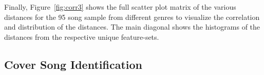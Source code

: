\noindent Finally, Figure~\ref{fig:corr3} shows the full scatter plot matrix of the various distances for the 95 song sample from different genres to visualize the correlation and distribution of the distances. The main diagonal shows the histograms of the distances from the respective unique feature-sets.

\begin{figure}[htbp]
	\centering
\end{figure}
\FloatBarrier


\subsection{Cover Song Identification}\label{covsongid}

